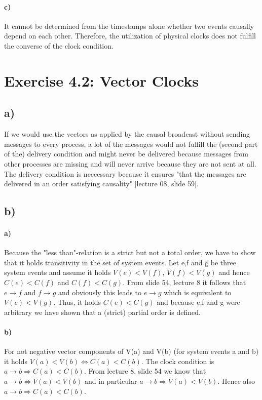 \documentclass[12pt,a4paper]{article}
\begin{document}
  	\paragraph{c)} It cannot be determined from the timestamps alone whether two events causally depend on each other. Therefore, the utilization of physical clocks does not fulfill the converse of the clock condition.
  	
\section{Exercise 4.2: Vector Clocks}
	\subsection*{a)} %
	If we would use the vectors as applied by the causal broadcast without sending messages to every process, a lot of the messages would not fulfill the (second part of the) delivery condition and might never be delivered because messages from other processes are missing and will never arrive because they are not sent at all. The delivery condition is neccessary because it ensures "that the messages are delivered in an order
	satisfying causality" [lecture 08, slide 59].
	\subsection*{b)} %
		\paragraph{a)} Because the "less than"-relation is a strict but not a total order, we have to show that it holds transitivity in the set of system events. Let e,f and g be three system events and assume it holds $V(e)<V(f)$, $V(f)<V(g)$ and hence $C(e)<C(f)$ and $C(f)<C(g)$. From slide 54, lecture 8 it follows that $e \rightarrow f$ and $f \rightarrow g$ and obviously this leads to $e \rightarrow g$ which is equivalent to $V(e)<V(g)$. Thus, it holds $C(e)<C(g)$ and because e,f and g were arbitrary we have shown that a (strict) partial order is defined.
		\paragraph{b)} For not negative vector components of V(a) and V(b) (for system events a and b) it holds $V(a)<V(b) \Leftrightarrow C(a)<C(b)$. The clock condition is $a \rightarrow b \Rightarrow C(a)<C(b)$. From lecture 8, slide 54 we know that $a \rightarrow b \Leftrightarrow V(a)<V(b)$ and in particular  $a \rightarrow b \Rightarrow V(a)<V(b)$. Hence also $a \rightarrow b \Rightarrow C(a)<C(b)$.
\end{document}
